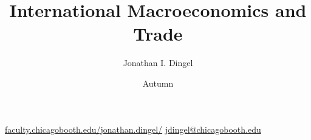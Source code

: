 
\usepackage{graphics}  %
\usepackage{graphicx}  %
\usepackage{url}	   %
\usepackage{soul}      %
\usepackage{booktabs} %
\usepackage{natbib}
\usepackage{bibentry}  %
\usepackage{bbm}       %
\usepackage{verbatim}  %
\usepackage{tikz}		%
\usepackage{pgfplots} %
\usepackage{amsfonts}  %
\usepackage{amsmath}   %
\usepackage{amsthm}    %
\usepackage{physics}

\urldef{\dingelhomepage}\url{faculty.chicagobooth.edu/jonathan.dingel/}
\urldef{\dingelemail}\url{jdingel@chicagobooth.edu}
\def\newblock{} %
\linespread{1.2}
\hypersetup{backref,pdfpagemode=FullScreen,colorlinks=true,linkcolor=blue,urlcolor=blue}
\newtheorem{proposition}{Proposition}
\newtheorem{assumption}{Assumption}

\title{International Macroeconomics and Trade}
\author{Jonathan I. Dingel}
\date{Autumn \the\year}



